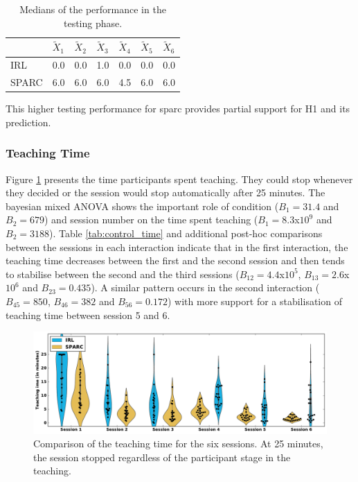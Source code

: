 \begin{table}[ht]
	\centering
	\caption{Medians of the performance in the testing phase.}
	\label{tab:control_perf}
	\begin{tabular}{@{}lllllll@{}}\toprule
		& $\widetilde{X}_{1}$ & $\widetilde{X}_{2}$ & $\widetilde{X}_{3}$ & $\widetilde{X}_{4}$ & $\widetilde{X}_{5}$ & $\widetilde{X}_{6}$\\ 
		\midrule
    IRL & 0.0 & 0.0 & 1.0 & 0.0 & 0.0 & 0.0\\
    SPARC & 6.0 & 6.0 & 6.0 & 4.5 & 6.0 & 6.0\\
    \bottomrule
	\end{tabular}
\end{table}

This higher testing performance for \gls{sparc} provides partial support for H1 and its prediction.

\subsubsection{Teaching Time}

Figure \ref{fig:control_time} presents the time participants spent teaching. They could stop whenever they decided or the  session would stop automatically after 25 minutes. The bayesian mixed ANOVA shows the important role of condition ($B_1=31.4$ and $B_2 = 679$) and session number on the time spent teaching ($B_1=8.3$x$10^9$ and $B_2 = 3188$). Table \ref{tab:control_time} and additional post-hoc comparisons between the sessions in each interaction indicate that in the first interaction, the teaching time decreases between the first and the second session and then tends to stabilise between the second and the third sessions ($B_{12}=4.4$x$10^5$, $B_{13}=2.6$x$10^6$ and $B_{23}=0.435$). A similar pattern occurs in the second interaction ($B_{45}=850$, $B_{46}=382$ and $B_{56}=0.172$) with more support for a stabilisation of teaching time between session 5 and 6.

\begin{figure}[ht]
	\includegraphics[width=\textwidth]{time.pdf}
	\centering
	\caption{Comparison of the teaching time for the six sessions. At 25 minutes, the session stopped regardless of the participant stage in the teaching.
	}
	\label{fig:control_time}
\end{figure}

